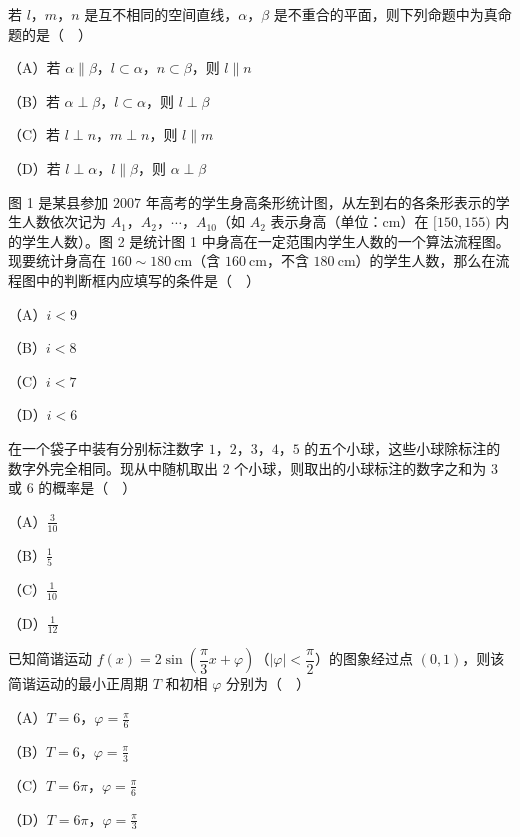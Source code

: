 \endgroup
\begin{question}
若 $l$，$m$，$n$ 是互不相同的空间直线，$\alpha$，$\beta$ 是不重合的平面，则下列命题中为真命题的是（　）

（A）若 $\alpha\parallel\beta$，$l\subset\alpha$，$n\subset\beta$，则 $l\parallel n$

（B）若 $\alpha\perp\beta$，$l\subset\alpha$，则 $l\perp\beta$

（C）若 $l\perp n$，$m\perp n$，则 $l\parallel m$

（D）若 $l\perp\alpha$，$l\parallel\beta$，则 $\alpha\perp\beta$

\Needspace{0.4\textheight}
\end{question}
\begin{question}
图 1 是某县参加 $2007$ 年高考的学生身高条形统计图，从左到右的各条形表示的学生人数依次记为 $A_1$，$A_2$，$\cdots$，$A_{10}$（如 $A_2$ 表示身高（单位：$\mathrm{cm}$）在 $[150,155)$ 内的学生人数）。图 2 是统计图 1 中身高在一定范围内学生人数的一个算法流程图。现要统计身高在 $160\sim180\ \mathrm{cm}$（含 $160\ \mathrm{cm}$，不含 $180\ \mathrm{cm}$）的学生人数，那么在流程图中的判断框内应填写的条件是（　）
\nopagebreak[4]
\begin{center}\end{center}
\nopagebreak[4]
\nopagebreak[4]
\begin{center}\end{center}
\nopagebreak[4]
（A）$i<9$

（B）$i<8$

（C）$i<7$

（D）$i<6$

\end{question}
\begingroup
\renewenvironment{question}{\Needspace{0.35\textheight}}{}
\begin{question}
在一个袋子中装有分别标注数字 $1$，$2$，$3$，$4$，$5$ 的五个小球，这些小球除标注的数字外完全相同。现从中随机取出 $2$ 个小球，则取出的小球标注的数字之和为 $3$ 或 $6$ 的概率是（　）

（A）$\frac{3}{10}$

（B）$\frac15$

（C）$\frac1{10}$

（D）$\frac1{12}$

\end{question}
\endgroup
\begin{question}
已知简谐运动 $f(x)=2\sin\left(\dfrac{\pi}{3}x+\varphi\right)$（$|\varphi|<\dfrac{\pi}{2}$）的图象经过点 $(0,1)$，则该简谐运动的最小正周期 $T$ 和初相 $\varphi$ 分别为（　）

（A）$T=6$，$\varphi=\frac{\pi}{6}$

（B）$T=6$，$\varphi=\frac{\pi}{3}$

（C）$T=6\pi$，$\varphi=\frac{\pi}{6}$

（D）$T=6\pi$，$\varphi=\frac{\pi}{3}$

\Needspace{0.4\textheight}
\end{question}
